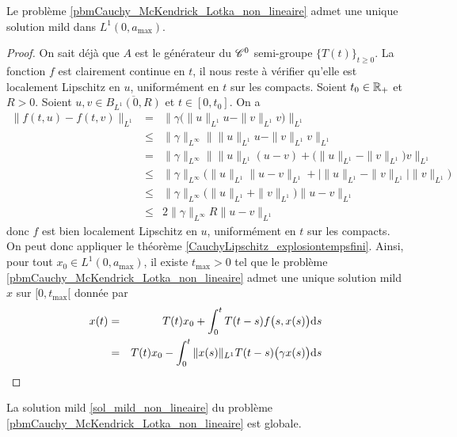\begin{theorem}
    Le problème \eqref{pbmCauchy_McKendrick_Lotka_non_lineaire} admet une unique solution mild dans $L^1(0,a_{\max})$.
\end{theorem}

\begin{proof}
    On sait déjà que $A$ est le générateur du $\mathscr{C}^0$ semi-groupe $\big\{T(t)\big\}_{t \geq 0}$. La fonction $f$ est clairement continue en $t$, il nous reste à vérifier qu'elle est localement Lipschitz en $u$, uniformément en $t$ sur les compacts. Soient $t_0 \in \mathbb{R}_+$ et $R>0$. Soient $u,v \in \overline{B_{L^1}(0,R)}$ et $t \in [0,t_0]$. On a 
    \begin{eqnarray*}
        \|f(t,u)-f(t,v)\|_{L^1} &=& \big\|\gamma \big(\|u\|_{L^1}u-\|v\|_{L^1}v\big)\big\|_{L^1} \\
        &\leq& \|\gamma\|_{L^\infty}\big\|\|u\|_{L^1}u-\|v\|_{L^1}v\big\|_{L^1} \\
        &=& \|\gamma\|_{L^\infty}\big\|\|u\|_{L^1}(u-v)+\big(\|u\|_{L^1}-\|v\|_{L^1}\big)v\big\|_{L^1} \\
        &\leq& \|\gamma\|_{L^\infty}\big(\|u\|_{L^1}\|u-v\|_{L^1}+\big|\|u\|_{L^1}-\|v\|_{L^1}\big|\|v\|_{L^1}\big) \\
        &\leq& \|\gamma\|_{L^\infty}\big(\|u\|_{L^1}+\|v\|_{L^1}\big)\|u-v\|_{L^1} \\
        &\leq& 2\|\gamma\|_{L^\infty}R\|u-v\|_{L^1}
    \end{eqnarray*}
    donc $f$ est bien localement Lipschitz en $u$, uniformément en $t$ sur les compacts. On peut donc appliquer le théorème \ref{CauchyLipschitz_explosiontempsfini}. Ainsi, pour tout $x_0 \in L^1(0,a_{\max})$, il existe $t_{\max} >0$ tel que le problème \eqref{pbmCauchy_McKendrick_Lotka_non_lineaire} admet une unique solution mild $x$ sur $[0,t_{\max}[$ donnée par 
    \begin{eqnarray}\label{sol_mild_non_lineaire}
        x(t) &=& T(t)x_0 + \int_0^t T(t-s)f\big(s,x(s)\big)\mathrm{d} s \nonumber \\
        &=& T(t)x_0 - \int_0^t \|x(s)\|_{L^1}T(t-s)\big(\gamma x(s)\big)\mathrm{d} s
    \end{eqnarray}
\end{proof}

\begin{corollaire}
    La solution mild \eqref{sol_mild_non_lineaire} du problème \eqref{pbmCauchy_McKendrick_Lotka_non_lineaire} est globale.
\end{corollaire}

